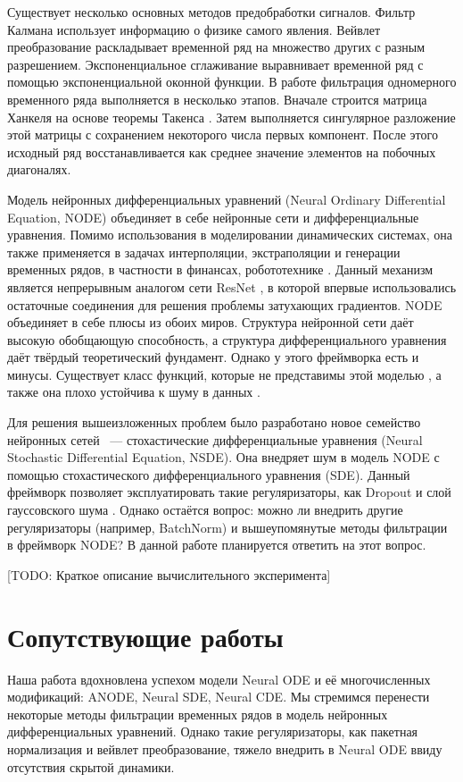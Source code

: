 \documentclass[a4paper, 14pt]{article}
\begin{document}
	Существует несколько основных методов предобработки сигналов.
	Фильтр Калмана \cite{Dhwaj2018} использует информацию о физике самого явления.
	Вейвлет преобразование \cite{Alrumaih2002} раскладывает временной ряд на множество других с разным разрешением.
	Экспоненциальное сглаживание \cite{gardner1985exponential} выравнивает временной ряд с помощью экспоненциальной оконной функции.
	В работе \cite{Ignatov2016} фильтрация одномерного временного ряда выполняется в несколько этапов.
	Вначале строится матрица Ханкеля на основе теоремы Такенса \cite{noakes1991takens}.
	Затем выполняется сингулярное разложение этой матрицы с сохранением некоторого числа первых компонент.
	После этого исходный ряд восстанавливается как среднее значение элементов на побочных диагоналях.
	
	Модель нейронных дифференциальных уравнений (Neural Ordinary Differential Equation, NODE) \cite{Chen2018} объединяет в себе нейронные сети и дифференциальные уравнения. 
	Помимо использования в моделировании динамических системах, она также применяется в задачах интерполяции, экстраполяции и генерации временных рядов, в частности в финансах, робототехнике \cite{xie2019neural, meleshkova2021application, du2020model}. 
	Данный механизм является непрерывным аналогом сети ResNet \cite{wu2019wider}, в которой впервые использовались остаточные соединения для решения проблемы затухающих градиентов.
	NODE объединяет в себе плюсы из обоих миров. 
	Структура нейронной сети даёт высокую обобщающую способность, а структура дифференциального уравнения даёт твёрдый теоретический фундамент.
	Однако у этого фреймворка есть и минусы. 
	Существует класс функций, которые не представимы этой моделью \cite{Dupont2019}, а также она плохо устойчива к шуму в данных \cite{Liu2019}.
	
	Для решения вышеизложенных проблем было разработано новое семейство нейронных сетей ~--- стохастические дифференциальные уравнения (Neural Stochastic Differential Equation, NSDE).
	Она внедряет шум в модель NODE с помощью стохастического дифференциального уравнения (SDE).
	Данный фреймворк позволяет эксплуатировать такие регуляризаторы, как Dropout и слой гауссовского шума \cite{liu2018towards, baldi2013understanding}.
	Однако остаётся вопрос: можно ли внедрить другие регуляризаторы (например, BatchNorm) и вышеупомянутые методы фильтрации в фреймворк NODE? 
	В данной работе планируется ответить на этот вопрос.
	
	[TODO: Краткое описание вычислительного эксперимента]
	
	\section{Сопутствующие работы}
	Наша работа вдохновлена успехом модели Neural ODE и её многочисленных модификаций: ANODE, Neural SDE, Neural CDE.
	Мы стремимся перенести некоторые методы фильтрации временных рядов в модель нейронных дифференциальных уравнений.
	Однако такие регуляризаторы, как пакетная нормализация и вейвлет преобразование, тяжело внедрить в Neural ODE ввиду отсутствия скрытой динамики.
\end{document}
